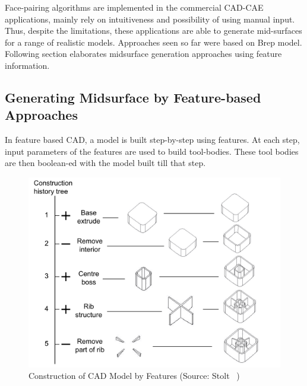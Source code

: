Face-pairing algorithms are implemented in the commercial CAD-CAE applications, mainly rely on intuitiveness and possibility of using manual input. Thus, despite the limitations, these applications are able to generate mid-surfaces for a range of realistic models. Approaches seen so far were based on Brep model. Following section elaborates midsurface generation approaches using feature information.



\subsection{Generating Midsurface by Feature-based Approaches}

In feature based CAD, a model is built step-by-step using features. At each step,  input parameters of the features are used to build tool-bodies. These tool bodies are then boolean-ed with the model built till that step. 


	\begin{figure} [!h]
		\centering
		\includegraphics[width=0.75\linewidth]{..//Common/images/stolttree}
		\caption{Construction of CAD Model by Features (Source: Stolt~\cite{Stolt2006} )}
		\label{fig:litsurvey:stolttree}
	\end{figure}

